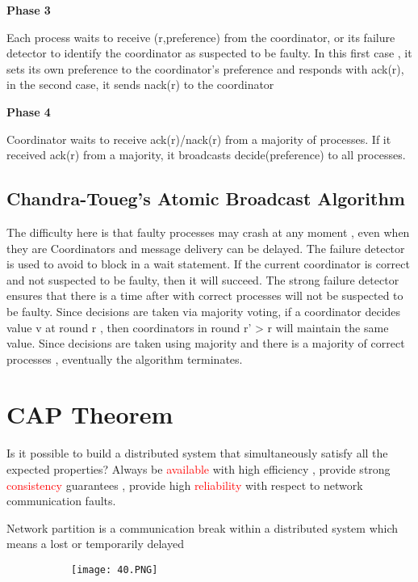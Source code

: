 \documentclass{article}
\begin{document}
\vspace{3mm}
\textbf{Phase 3}

Each process waits to receive (r,preference) from the coordinator, or its failure detector to identify the coordinator as suspected to be faulty. In this first case , it sets its own preference to the coordinator's preference and responds with ack(r), in the second case, it sends nack(r) to the coordinator

\vspace{3mm}
\textbf{Phase 4}

Coordinator waits to receive ack(r)/nack(r) from a majority of processes. If it received ack(r) from a majority, it broadcasts decide(preference) to all processes.

\subsection{Chandra-Toueg's Atomic Broadcast Algorithm}
The difficulty here is that faulty processes may crash at any moment , even when they are Coordinators and message delivery can be delayed. The failure detector is used to avoid to block in a wait statement.
If the current coordinator is correct and not suspected to be faulty, then it will succeed. The strong failure detector ensures that there is a time after with correct processes will not be suspected to be faulty.
Since decisions are taken via majority voting, if a coordinator decides value v at round r , then coordinators in round r' > r will maintain the same value.
Since decisions are taken using majority and there is a majority of correct processes , eventually the algorithm terminates.

\section{CAP Theorem}

Is it possible to build a distributed system that simultaneously satisfy all the expected properties? Always be \textcolor{red}{available} with high efficiency , provide strong \textcolor{red}{consistency} guarantees , provide high \textcolor{red}{reliability} with respect to network communication faults.

Network partition is a communication break within a distributed system which means a lost or temporarily delayed 



\begin{figure}[ht!]
  \centering
  \begin{subfigure}[b]{0.35\linewidth}
    \texttt{[image: 40.PNG]}
  \end{subfigure}
\end{figure}
\end{document}
